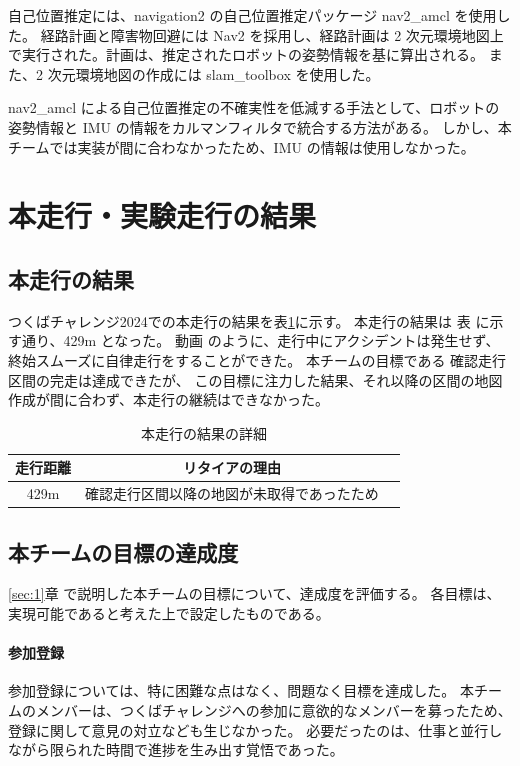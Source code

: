 \documentclass[twocolumn,9pt]{jsproceedings}
\begin{document}
自己位置推定には、navigation2 の自己位置推定パッケージ nav2\_amcl \cite{nav2_amcl} を使用した。
経路計画と障害物回避には Nav2 \cite{nav2} を採用し、経路計画は 2 次元環境地図上で実行された。計画は、推定されたロボットの姿勢情報を基に算出される。
また、2 次元環境地図の作成には slam\_toolbox \cite{slam_toolbox} を使用した。

nav2\_amcl による自己位置推定の不確実性を低減する手法として、ロボットの姿勢情報と IMU の情報をカルマンフィルタで統合する方法がある。
しかし、本チームでは実装が間に合わなかったため、IMU の情報は使用しなかった。

\section{本走行・実験走行の結果}
\subsection{本走行の結果}

つくばチャレンジ2024での本走行の結果を表\ref{MainRun}に示す。
本走行の結果は 表 に示す通り、429m となった。
動画 \cite{youtube_real_run} のように、走行中にアクシデントは発生せず、終始スムーズに自律走行をすることができた。
本チームの目標である 確認走行区間の完走は達成できたが、
この目標に注力した結果、それ以降の区間の地図作成が間に合わず、本走行の継続はできなかった。
\begin{table}[H]
  \caption{本走行の結果の詳細}
  \label{MainRun}
  \begin{tabular}{|c|c|p{4.0cm}|}
    \hline
    走行距離 & リタイアの理由 \\
    \hline
    429m   & 確認走行区間以降の地図が未取得であったため \\
    \hline
  \end{tabular}
\end{table}

\subsection{本チームの目標の達成度}

\ref{sec:1}章 で説明した本チームの目標について、達成度を評価する。
各目標は、実現可能であると考えた上で設定したものである。

\paragraph{参加登録}
参加登録については、特に困難な点はなく、問題なく目標を達成した。
本チームのメンバーは、つくばチャレンジへの参加に意欲的なメンバーを募ったため、登録に関して意見の対立なども生じなかった。
必要だったのは、仕事と並行しながら限られた時間で進捗を生み出す覚悟であった。
\end{document}
